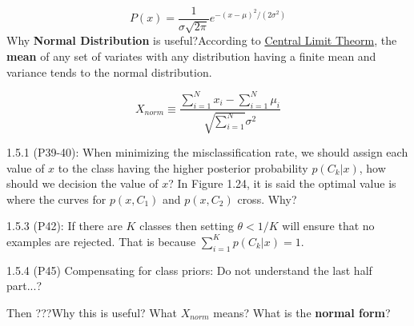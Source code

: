 \documentclass[12pt]{article}
\begin{document}
\begin{equation}
	P(x) = \frac{1}{\sigma\sqrt{2\pi}}e^{-(x-\mu)^2/(2\sigma^2)}
\end{equation}
Why \textbf{Normal Distribution} is useful?According to \href{http://mathworld.wolfram.com/CentralLimitTheorem.html}{Central Limit Theorm}, the \textbf{mean} of any set of variates with any distribution having a finite mean and variance tends to the normal distribution. 

\begin{equation}
X_{norm}\equiv\frac{\sum_{i=1}^Nx_{i}-\sum_{i=1}^N\mu_{i}}{\sqrt{\sum_{i=1}^N}\sigma^2}
\end{equation}

1.5.1 (P39-40): When minimizing the misclassification rate,
we should assign each value of $x$ to the class having
the higher posterior probability $p(C_k|x)$, how should
we decision the value of $x$? In Figure 1.24, it is said
the optimal value is where the curves for $p(x, C_1)$
and $p(x, C_2)$ cross. Why?

1.5.3 (P42): If there are $K$ classes then setting $\theta < 1/ K$
will ensure that no examples are rejected. That is because
$\sum^K_{i=1}p(C_k|x)=1$.

1.5.4 (P45) Compensating for class priors: Do not understand the
last half part...?

Then ???Why this is useful? What $X_{norm}$ means? What is the \textbf{normal form}?
\end{document}
